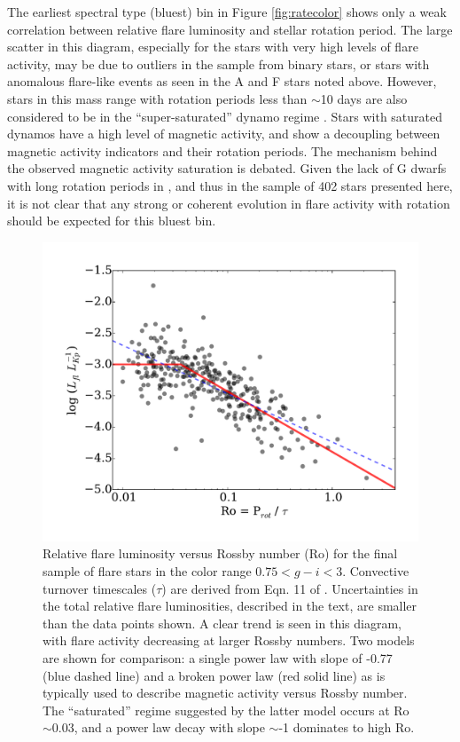 \documentclass[twocolumn]{aastex6}
\begin{document}
The earliest spectral type (bluest) bin in Figure \ref{fig:ratecolor} shows only a weak correlation between relative flare luminosity and stellar rotation period. The large scatter in this diagram, especially for the stars with very high levels of flare activity, may be due to outliers in the sample from binary stars, or stars with anomalous flare-like events as seen in the A and F stars noted above. However, stars in this mass range with rotation periods less than $\sim$10 days are also considered to be in the ``super-saturated'' dynamo regime \citet[e.g.][]{argiroffi2016}. Stars with saturated dynamos have a high level of magnetic activity, and show a decoupling between magnetic activity indicators and their rotation periods. The mechanism behind  the observed magnetic activity saturation is debated. Given the lack of G dwarfs with long rotation periods in \citet{mcquillan2014}, and thus in the sample of 402 stars presented here, it is not clear that any strong or coherent evolution in flare activity with rotation should be expected for this bluest bin.


\begin{figure}[!t]
\centering
\includegraphics[width=5in]{fig8}
\caption{Relative flare luminosity versus Rossby number (Ro) for the final sample of flare stars in the color range $0.75 < g-i < 3$. Convective turnover timescales ($\tau$) are derived from Eqn. 11 of \citet{wright2011}. Uncertainties in the total relative flare luminosities, described in the text, are smaller than the data points shown. A clear trend is seen in this diagram, with flare activity decreasing at larger Rossby numbers. Two models are shown for comparison: a single power law with slope of -0.77 (blue dashed line) and a broken power law (red solid line) as is typically used to describe magnetic activity versus Rossby number. The ``saturated'' regime suggested by the latter model occurs at Ro$\sim$0.03, and a power law decay with slope $\sim$-1 dominates to high Ro.
}
\label{fig:rossby}
\end{figure}
\end{document}
